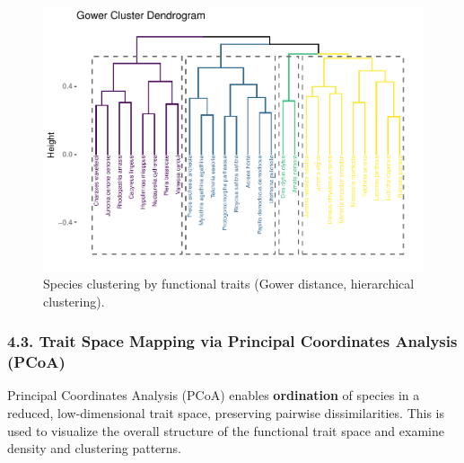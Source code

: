 \documentclass[
]{article}
\begin{document}
\begin{figure}
\includegraphics[width=1\linewidth]{man/figures/README-gower-dendro-1} \caption{Species clustering by functional traits (Gower distance, hierarchical clustering).}\label{fig:gower-dendro}
\end{figure}

\hypertarget{trait-space-mapping-via-principal-coordinates-analysis-pcoa}{%
\subsubsection{4.3. Trait Space Mapping via Principal Coordinates
Analysis
(PCoA)}\label{trait-space-mapping-via-principal-coordinates-analysis-pcoa}}

Principal Coordinates Analysis (PCoA) enables \textbf{ordination} of
species in a reduced, low-dimensional trait space, preserving pairwise
dissimilarities. This is used to visualize the overall structure of the
functional trait space and examine density and clustering patterns.
\end{document}
